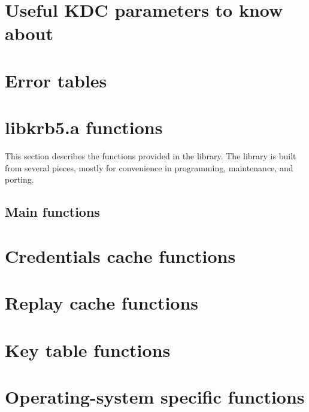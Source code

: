 \section{Useful KDC parameters to know about}


\section{Error tables}


\newpage

\section{libkrb5.a functions}
This section describes the functions provided in the 
library.  The library is built from several pieces, mostly for convenience in
programming, maintenance, and porting.

\ifdraft\sloppy\fi

\subsection{Main functions}


\section{Credentials cache functions}


\section{Replay cache functions}


\section{Key table functions}


\section{Operating-system specific functions}


\appendix
\cleardoublepage


